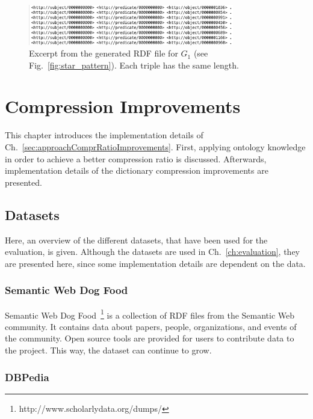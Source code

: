 \begin{figure}[h]
	\centering
	\includegraphics[width=0.8\textwidth]{figures/GRPvsHDT/file.png}
	\caption{Excerpt from the generated RDF file for $G_1$ (see Fig.~\ref{fig:star_pattern}). Each triple has the same length.}
	\label{fig:rdfFile}
\end{figure}

\section{Compression Improvements}\label{sec:implementationComprRatioImprovements}

This chapter introduces the implementation details of Ch.~\ref{sec:approachComprRatioImprovements}. First, applying ontology knowledge in order to achieve a better compression ratio is discussed. Afterwards, implementation details of the dictionary compression improvements are presented.

\subsection{Datasets}\label{sec:implementationDatasets}

Here, an overview of the different datasets, that have been used for the evaluation, is given. Although the datasets are used in Ch.~\ref{ch:evaluation}, they are presented here, since some implementation details are dependent on the data.

\subsubsection{Semantic Web Dog Food}

Semantic Web Dog Food~\footnote{http://www.scholarlydata.org/dumps/} is a collection of RDF files from the Semantic Web community. It contains data about papers, people, organizations, and events of the community. Open source tools are provided for users to contribute data to the project.	This way, the dataset can continue to grow.~\cite{dogfood}

\subsubsection{DBPedia}

